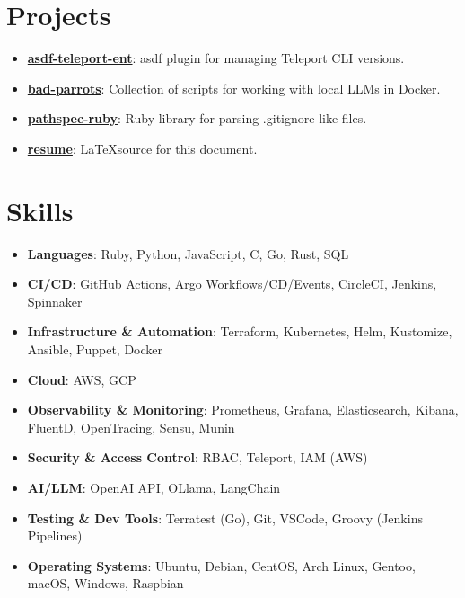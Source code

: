 \documentclass[letterpaper,11pt]{article}
\newcommand{\resumeItem}[2]{
\item[\textsc{}]\small{
    \textbf{#1}{: #2 \vspace{-2pt}}
  }
}
\newcommand{\resumeSubItem}[2]{\resumeItem{#1}{#2}\vspace{-4pt}}
\newcommand{\resumeSubHeadingListStart}{\begin{itemize}[leftmargin=*]}
\newcommand{\resumeSubHeadingListEnd}{\end{itemize}}
\begin{document}
\section{Projects}
  \resumeSubHeadingListStart
    \resumeSubItem{\href{https://github.com/highb/asdf-teleport-ent}{asdf-teleport-ent}}
      {asdf plugin for managing Teleport CLI versions.}
    \resumeSubItem{\href{https://github.com/highb/bad-parrots}{bad-parrots}}
      {Collection of scripts for working with local LLMs in Docker.}
    \resumeSubItem{\href{https://github.com/highb/pathspec-ruby}{pathspec-ruby}}
      {Ruby library for parsing .gitignore-like files.}
    \resumeSubItem{\href{https://github.com/highb/resume}{resume}}
      {\LaTeX source for this document.}
  \resumeSubHeadingListEnd

\section{Skills}
  \resumeSubHeadingListStart
    \resumeSubItem{Languages}
      {Ruby, Python, JavaScript, C, Go, Rust, SQL}
    \resumeSubItem{CI/CD}
      {GitHub Actions, Argo Workflows/CD/Events, CircleCI, Jenkins, Spinnaker}
    \resumeSubItem{Infrastructure \& Automation}
      {Terraform, Kubernetes, Helm, Kustomize, Ansible, Puppet, Docker}
    \resumeSubItem{Cloud}
      {AWS, GCP}
    \resumeSubItem{Observability \& Monitoring}
      {Prometheus, Grafana, Elasticsearch, Kibana, FluentD, OpenTracing, Sensu, Munin}
    \resumeSubItem{Security \& Access Control}
      {RBAC, Teleport, IAM (AWS)}
    \resumeSubItem{AI/LLM}
      {OpenAI API, OLlama, LangChain}
    \resumeSubItem{Testing \& Dev Tools}
      {Terratest (Go), Git, VSCode, Groovy (Jenkins Pipelines)}
    \resumeSubItem{Operating Systems}
      {Ubuntu, Debian, CentOS, Arch Linux, Gentoo, macOS, Windows, Raspbian}
  \resumeSubHeadingListEnd



\end{document}
